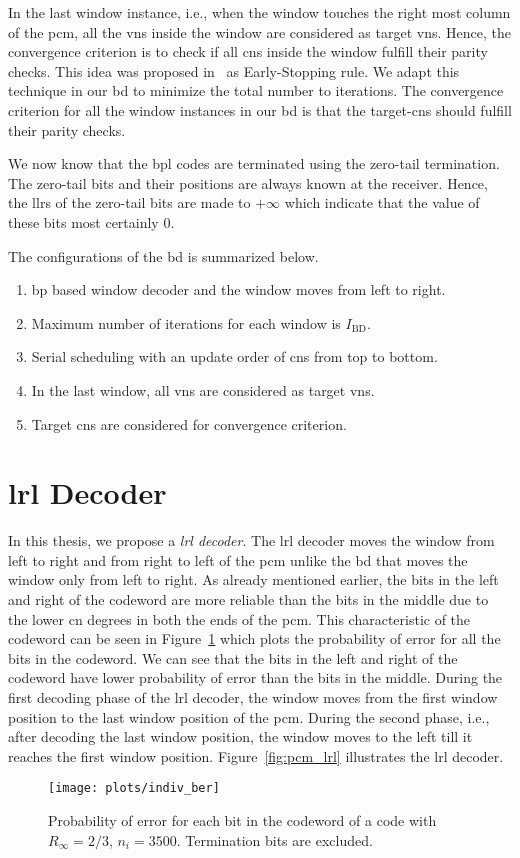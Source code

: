In the last window instance, i.e., when the window touches the right most column of the \gls{pcm}, all the \glspl{vn} inside the window are considered as target \glspl{vn}. Hence, the convergence criterion is to check if all \glspl{cn} inside the window fulfill their parity checks. This idea was proposed in~\cite{Ali2018} as Early-Stopping rule. We adapt this technique in our \gls{bd} to minimize the total number to iterations. The convergence criterion for all the window instances in our \gls{bd} is that the target-\glspl{cn} should fulfill their parity checks.

We now know that the \gls{bpl} codes are terminated using the zero-tail termination. The zero-tail bits and their positions are always known at the receiver. Hence, the \glspl{llr} of the zero-tail bits are made to $+\infty$ which indicate that the value of these bits most certainly 0.

The configurations of the \gls{bd} is summarized below.
\begin{enumerate}
  \item \gls{bp} based window decoder and the window moves from left to right.
  \item Maximum number of iterations for each window is $I_{\text{BD}}$.
  \item Serial scheduling with an update order of \glspl{cn} from top to bottom.
  \item In the last window, all \glspl{vn} are considered as target \glspl{vn}.
  \item Target \glspl{cn} are considered for convergence criterion.
\end{enumerate}

\section{\acrlong{lrl} Decoder}
In this thesis, we propose a \emph{\gls{lrl} decoder}. The \gls{lrl} decoder moves the window from left to right and from right to left of the \gls{pcm} unlike the \gls{bd} that moves the window only from left to right. As already mentioned earlier, the bits in the left and right of the codeword are more reliable than the bits in the middle due to the lower \gls{cn} degrees in both the ends of the \gls{pcm}. This characteristic of the codeword can be seen in Figure~\ref{fig:indiv_ber} which plots the probability of error for all the bits in the codeword. We can see that the bits in the left and right of the codeword have lower probability of error than the bits in the middle. During the first decoding phase of the \gls{lrl} decoder, the window moves from the first window position to the last window position of the \gls{pcm}. During the second phase, i.e., after decoding the last window position, the window moves to the left till it reaches the first window position. Figure~\ref{fig:pcm_lrl} illustrates the \gls{lrl} decoder.
\begin{figure}[htbp]
  \centering
  \texttt{[image: plots/indiv\_ber]}
  \caption{Probability of error for each bit in the codeword of a code with $R_\infty=2/3$, $n_i=3500$. Termination bits are excluded.}
  \label{fig:indiv_ber}
\end{figure}

